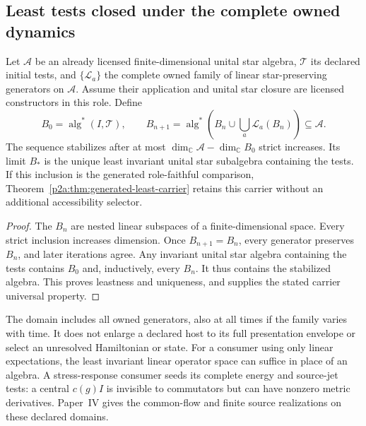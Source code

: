 \documentclass[12pt,a4paper]{article}
\begin{document}
\subsection{Least tests closed under the complete owned dynamics}
\label{p2a:sec:least-dynamic-tests}
\begin{corollary}
\label{p2a:cor:least-dynamic-test-algebra}
Let $\mathcal A$ be an already licensed finite-dimensional unital star
algebra, $\mathcal T$ its declared initial tests, and
$\{\mathcal L_a\}$ the complete owned family of linear star-preserving
generators on $\mathcal A$. Assume their application and unital star
closure are licensed constructors in this role. Define
\[
 B_0=\operatorname{alg}^{*}(I,\mathcal T),\qquad
 B_{n+1}=\operatorname{alg}^{*}
       \left(B_n\cup\bigcup_a\mathcal L_a(B_n)\right)
       \subseteq\mathcal A.
\]
The sequence stabilizes after at most
$\dim_{\mathbb C}\mathcal A-\dim_{\mathbb C}B_0$ strict increases.
Its limit $B_*$ is the unique least invariant unital star subalgebra
containing the tests. If this inclusion is the generated role-faithful
comparison, Theorem~\ref{p2a:thm:generated-least-carrier} retains this
carrier without an additional accessibility selector.
\end{corollary}
\begin{proof}
The $B_n$ are nested linear subspaces of a finite-dimensional space.
Every strict inclusion increases dimension. Once $B_{n+1}=B_n$, every
generator preserves $B_n$, and later iterations agree. Any invariant unital
star algebra containing the tests contains $B_0$ and, inductively, every
$B_n$. It thus contains the stabilized algebra. This proves leastness and
uniqueness, and supplies the stated carrier universal property.
\end{proof}
The domain includes all owned generators, also at all times if the family
varies with time. It does not enlarge a declared host to its full
presentation envelope or select an unresolved Hamiltonian or state.
For a consumer using only linear expectations, the least invariant linear
operator space can suffice in place of an algebra. A stress-response
consumer seeds its complete energy and source-jet tests: a central
$c(g)I$ is invisible to commutators but can have nonzero metric derivatives.
Paper~IV gives the common-flow and finite source realizations on these
declared domains.
\end{document}
